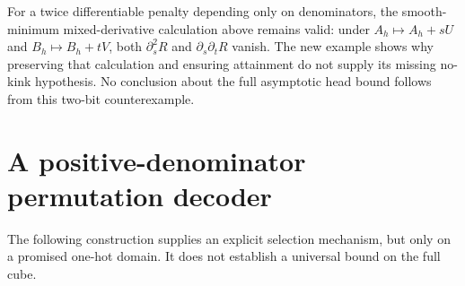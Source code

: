 \documentclass[11pt]{article}
\begin{document}
For a twice differentiable penalty depending only on denominators,
the smooth-minimum mixed-derivative calculation above remains valid:
under $A_h\mapsto A_h+sU$ and $B_h\mapsto B_h+tV$, both
$\partial_s^2 R$ and $\partial_s\partial_t R$ vanish. The new
example shows why preserving that calculation and ensuring attainment
do not supply its missing no-kink hypothesis. No conclusion about the
full asymptotic head bound follows from this two-bit counterexample.

\section{A positive-denominator permutation decoder}

The following construction supplies an explicit selection mechanism, but
only on a promised one-hot domain. It does not establish a universal
bound on the full cube.
\end{document}
